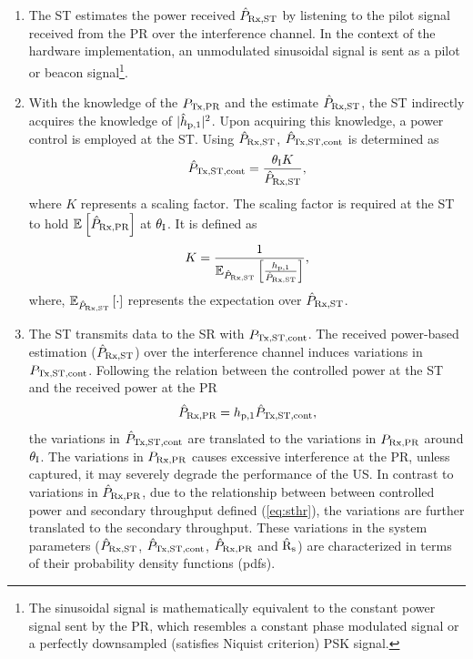\begin{enumerate}
	\item The ST estimates the power received $\hat{P}_{\text{Rx,ST}}$ by listening to the pilot signal received from the PR over the interference channel. In the context of the hardware implementation, an unmodulated sinusoidal signal is sent as a pilot or beacon signal\footnote{The sinusoidal signal is mathematically equivalent to the constant power signal sent by the PR, which resembles a constant phase modulated signal or a perfectly downsampled (satisfies Niquist criterion) PSK signal.}.
	\item With the knowledge of the $P_{\text{Tx,PR}}$ and the estimate $\hat{P}_{\text{Rx,ST}}$, the ST indirectly acquires the knowledge of $|\hat{h}_{\text{p,1}}|^2$. 
	Upon acquiring this knowledge, a power control is employed at the ST. Using $\hat{P}_{\text{Rx,ST}}$, $\hat{P}_{\text{Tx,ST,cont}}$ is determined as 
\begin{align}
\hat{P}_{\text{Tx,ST,cont}} = \frac{\theta_{\text{I}} K}{\hat{P}_{\text{Rx,ST}}}, \label{eq:preg} 
\end{align}
where $K$ represents a scaling factor. The scaling factor is required at the ST to hold ${\mathbb E}_{}\left[ \hat{P}_{\text{Rx,PR}} \right]$ at $\theta_{\text{I}}$. It is defined as
\begin{align}
K = \frac{1}{ \e{\eprcvd}{\frac{\gpo}{\eprcvd}}},%
\end{align}
where, ${\mathbb E}_{\hat{P}_{\text{Rx,ST}}}\left[ \cdot \right]$ represents the expectation over $\hat{P}_{\text{Rx,ST}}$.
	\item The ST transmits data to the SR with $P_{\text{Tx,ST,cont}}$. 
	The received power-based estimation ($\hat{P}_{\text{Rx,ST}}$) over the interference channel induces variations in $P_{\text{Tx,ST,cont}}$. Following the relation between the controlled power at the ST and the received power at the PR 
\begin{align}
\hat{P}_{\text{Rx,PR}}  = h_{\text{p,1}} \hat{P}_{\text{Tx,ST,cont}},
\end{align}
the variations in $\hat{P}_{\text{Tx,ST,cont}}$ are translated to the variations in $P_{\text{Rx,PR}}$ around $\theta_{\text{I}}$. The variations in $P_{\text{Rx,PR}}$ causes excessive interference at the PR, unless captured, it may severely degrade the performance of the US. In contrast to variations in $\hat{P}_{\text{Rx,PR}}$, due to the relationship between between controlled power and secondary throughput defined (\ref{eq:sthr}), the variations are further translated to the secondary throughput. These variations in the system parameters ($\hat{P}_{\text{Rx,ST}}$, $\hat{P}_{\text{Tx,ST,cont}}$, $\hat{P}_{\text{Rx,PR}}$ and $\hat{\text{{R}}}_{\text{s}}$) are characterized in terms of their probability density functions (pdfs).  

\end{enumerate}
